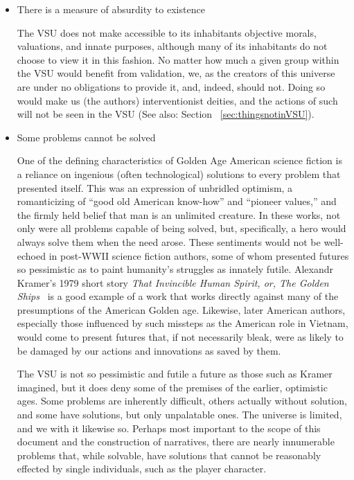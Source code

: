 \begin{itemize}

\item There is a measure of absurdity to existence

The VSU does not make accessible to its inhabitants objective morals,
valuations, and innate purposes, although many of its inhabitants do
not choose to view it in this fashion. No matter how much a given
group within the VSU would benefit from validation, we, as the
creators of this universe are under no obligations to provide it, and,
indeed, should not. Doing so would make us (the authors)
interventionist deities, and the actions of such will not be seen in
the VSU (See also: Section ~\ref{sec:thingsnotinVSU}).

\item Some problems cannot be solved

One of the defining characteristics of Golden Age American science
fiction is a reliance on ingenious (often technological) solutions to
every problem that presented itself. This was an expression of
unbridled optimism, a romanticizing of ``good old American
know-how'' and ``pioneer values,'' and the firmly held belief that man
is an unlimited creature. In these works, not only were all problems
capable of being solved, but, specifically, a hero would always solve
them when the need arose. These sentiments would not be well-echoed in
post-WWII science fiction authors, some of whom presented futures so
pessimistic as to paint humanity's struggles as innately
futile. Alexandr Kramer's 1979 short story
\emph{That Invincible Human Spirit, or, The Golden
Ships}~\cite{GoldenShips} is a good example of a work that works
directly against many of the presumptions of the American Golden
age. Likewise, later American authors, especially those influenced by
such missteps as the American role in Vietnam, would come to present
futures that, if not necessarily bleak, were as likely to be damaged
by our actions and innovations as saved by them.

The VSU is not so pessimistic and futile a future as those such as
Kramer imagined, but it does deny some of the premises of the earlier,
optimistic ages. Some problems are inherently difficult, others
actually without solution, and some have solutions, but only
unpalatable ones. The universe is limited, and we with it likewise
so. Perhaps most important to the scope of this document and the
construction of narratives, there are nearly innumerable problems
that, while solvable, have solutions that cannot be reasonably
effected by single individuals, such as the player character.


\end{itemize}
